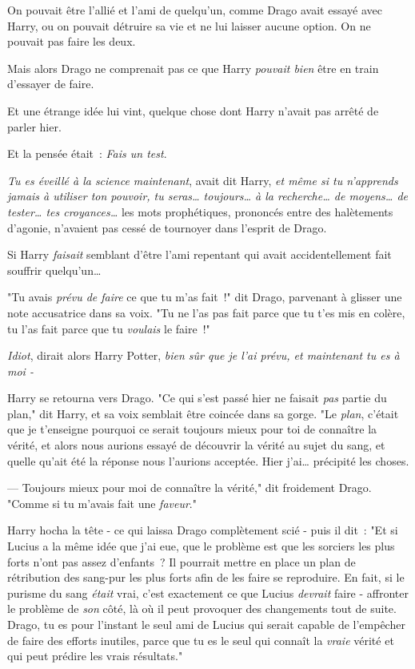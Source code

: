 On pouvait être l'allié et l'ami de quelqu'un, comme Drago avait essayé avec Harry, ou on pouvait détruire sa vie et ne lui laisser aucune option. On ne pouvait pas faire les deux.

Mais alors Drago ne comprenait pas ce que Harry \emph{pouvait bien} être en train d'essayer de faire.

Et une étrange idée lui vint, quelque chose dont Harry n'avait pas arrêté de parler hier.

Et la pensée était~: \emph{Fais un test}.

\emph{Tu es éveillé à la science maintenant}, avait dit Harry, \emph{et même si tu n'apprends jamais à utiliser ton pouvoir, tu seras… toujours… à la recherche… de moyens… de tester… tes croyances…} les mots prophétiques, prononcés entre des halètements d'agonie, n'avaient pas cessé de tournoyer dans l'esprit de Drago.

Si Harry \emph{faisait} semblant d'être l'ami repentant qui avait accidentellement fait souffrir quelqu'un…

"Tu avais \emph{prévu de faire} ce que tu m'as fait~!" dit Drago, parvenant à glisser une note accusatrice dans sa voix. "Tu ne l'as pas fait parce que tu t'es mis en colère, tu l'as fait parce que tu \emph{voulais} le faire~!"

\emph{Idiot}, dirait alors Harry Potter, \emph{bien sûr que je l'ai prévu, et maintenant tu es à moi -}

Harry se retourna vers Drago. "Ce qui s'est passé hier ne faisait \emph{pas} partie du plan," dit Harry, et sa voix semblait être coincée dans sa gorge. "Le \emph{plan}, c'était que je t'enseigne pourquoi ce serait toujours mieux pour toi de connaître la vérité, et alors nous aurions essayé de découvrir la vérité au sujet du sang, et quelle qu'ait été la réponse nous l'aurions acceptée. Hier j'ai… précipité les choses.

--- Toujours mieux pour moi de connaître la vérité," dit froidement Drago. "Comme si tu m'avais fait une \emph{faveur}."

Harry hocha la tête - ce qui laissa Drago complètement scié - puis il dit~: "Et si Lucius a la même idée que j'ai eue, que le problème est que les sorciers les plus forts n'ont pas assez d'enfants~? Il pourrait mettre en place un plan de rétribution des sang-pur les plus forts afin de les faire se reproduire. En fait, si le purisme du sang \emph{était} vrai, c'est exactement ce que Lucius \emph{devrait} faire - affronter le problème de \emph{son} côté, là où il peut provoquer des changements tout de suite. Drago, tu es pour l'instant le seul ami de Lucius qui serait capable de l'empêcher de faire des efforts inutiles, parce que tu es le seul qui connaît la \emph{vraie} vérité et qui peut prédire les vrais résultats."

